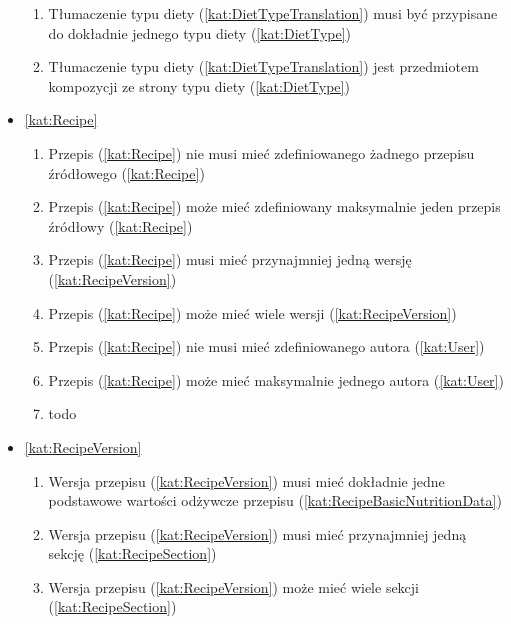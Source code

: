 \begin{itemize}[label={\textbf{Reguły dla}}, wide, labelwidth=!, labelindent=0pt]
    \begin{enumerate}[label={\textbf{REG/\protect\threedigits{\arabic{enumi}}}}, wide, labelwidth=!, align=left, leftmargin=3cm, resume]
        \item Tłumaczenie typu diety (\ref{kat:DietTypeTranslation}) musi być przypisane do dokładnie jednego typu diety (\ref{kat:DietType})
        \item Tłumaczenie typu diety (\ref{kat:DietTypeTranslation}) jest przedmiotem kompozycji ze strony typu diety (\ref{kat:DietType})
    \end{enumerate}
    \item\ref{kat:Recipe}
    \begin{enumerate}[label={\textbf{REG/\protect\threedigits{\arabic{enumi}}}}, wide, labelwidth=!, align=left, leftmargin=3cm, resume]
        \item Przepis (\ref{kat:Recipe}) nie musi mieć zdefiniowanego żadnego przepisu źródłowego (\ref{kat:Recipe})
        \item Przepis (\ref{kat:Recipe}) może mieć zdefiniowany maksymalnie jeden przepis źródłowy (\ref{kat:Recipe})
        \item Przepis (\ref{kat:Recipe}) musi mieć przynajmniej jedną wersję (\ref{kat:RecipeVersion})
        \item Przepis (\ref{kat:Recipe}) może mieć wiele wersji (\ref{kat:RecipeVersion})
        \item Przepis (\ref{kat:Recipe}) nie musi mieć zdefiniowanego autora (\ref{kat:User})
        \item Przepis (\ref{kat:Recipe}) może mieć maksymalnie jednego autora (\ref{kat:User})
        \item todo
    \end{enumerate}
    \item\ref{kat:RecipeVersion}
    \begin{enumerate}[label={\textbf{REG/\protect\threedigits{\arabic{enumi}}}}, wide, labelwidth=!, align=left, leftmargin=3cm, resume]
        \item Wersja przepisu (\ref{kat:RecipeVersion}) musi mieć dokładnie jedne podstawowe wartości odżywcze przepisu (\ref{kat:RecipeBasicNutritionData})
        \item Wersja przepisu (\ref{kat:RecipeVersion}) musi mieć przynajmniej jedną sekcję (\ref{kat:RecipeSection})
        \item Wersja przepisu (\ref{kat:RecipeVersion}) może mieć wiele sekcji (\ref{kat:RecipeSection})

\end{enumerate}
\end{itemize}
